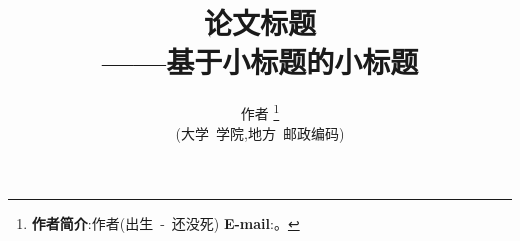 \title{
  {\LARGE \textbf{论文标题}} \\
  {\large ——基于小标题的小标题}
  \vspace{-0.75em}
}
\author{
  {
    作者
  }\thanks{
    \textbf{作者简介}:作者(出生~-~还没死)
    \textbf{E-mail}:。
  } \\
  {\footnotesize {}
    (大学~学院,地方~邮政编码)
  }
}
\date{}
